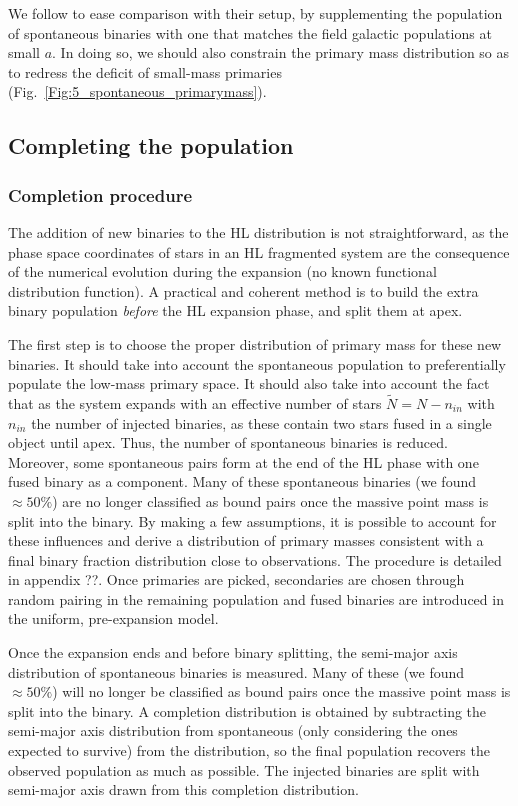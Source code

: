 We follow \cite{Parker2014} to ease comparison with their setup, by supplementing the population of spontaneous binaries with one that matches the field galactic populations at small $a$. 
In doing so, we should also constrain the primary mass distribution so as to redress the deficit of small-mass primaries (Fig.~\ref{Fig:5_spontaneous_primarymass}).



\subsection{Completing the population}
\label{Sec:Completing}

\subsubsection*{Completion procedure}

The addition of new binaries to the HL distribution is not straightforward, as the phase space coordinates of stars in an HL fragmented system are the consequence of the numerical evolution during the expansion (no known functional distribution function). A practical and coherent method is to build the extra binary population \textit{before} the HL expansion phase, and split them at apex.

The first step is to choose the proper distribution of primary mass for these new binaries. It should take into account the spontaneous population to preferentially populate the low-mass primary space. It should also take into account the fact that as the system expands with an effective number of stars $\tilde{N} = N - n_{in}$ with $n_{in}$ the number of injected binaries, as these contain two stars fused in a single object until apex. Thus, the number of spontaneous binaries is reduced. Moreover, some spontaneous pairs form at the end of the HL phase with one fused binary as a component. Many of these spontaneous binaries (we found $\approx 50\%$)  are no longer classified as bound pairs  once the massive point mass is split into the binary. By making a few assumptions, it is possible to account for these influences and derive a distribution of primary masses consistent with a final binary fraction distribution close to observations. The procedure is detailed in appendix ??. Once primaries are picked, secondaries are chosen through random pairing in the remaining population and fused binaries are introduced in the uniform, pre-expansion model.

Once the expansion ends and before binary splitting, the semi-major axis distribution of spontaneous binaries is measured. Many of these (we found $\approx 50\%$)  will no longer be classified as bound pairs once the massive point mass is split into the binary. A completion distribution is obtained by subtracting the semi-major axis distribution from spontaneous (only considering the ones expected to survive) from the \cite{Raghavan2010} distribution, so the final population recovers the observed population as much as possible. The injected binaries are split with semi-major axis drawn from this completion distribution. 

